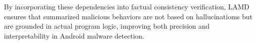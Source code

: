 
\noindent By incorporating these dependencies into factual consistency verification, LAMD ensures that summarized malicious behaviors are not based on hallucinatioms but are grounded in actual program logic, improving both precision and interpretability in Android malware detection.



